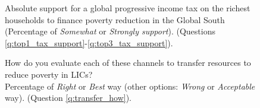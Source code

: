 \begin{figure}[h!]
    \caption[Absolute support for an income tax on top 1\% to fund LICs]{Absolute support for a global progressive income tax on the richest households to finance poverty reduction in the Global South (Percentage of \textit{Somewhat} or \textit{Strongly support}). (Questions \ref{q:top1_tax_support}-\ref{q:top3_tax_support}).
    }\label{fig:top_tax_positive}
\end{figure}

\begin{figure}[h!]
    \caption[\textit{Right} or \textit{Best} way to transfer resources to LICs]{How do you evaluate each of these channels to transfer resources to reduce poverty in LICs?\\ Percentage of \textit{Right} or \textit{Best} way (other options: \textit{Wrong} or \textit{Acceptable} way). (Question \ref{q:transfer_how}).
    }\label{fig:transfer_how_positive}
\end{figure}

